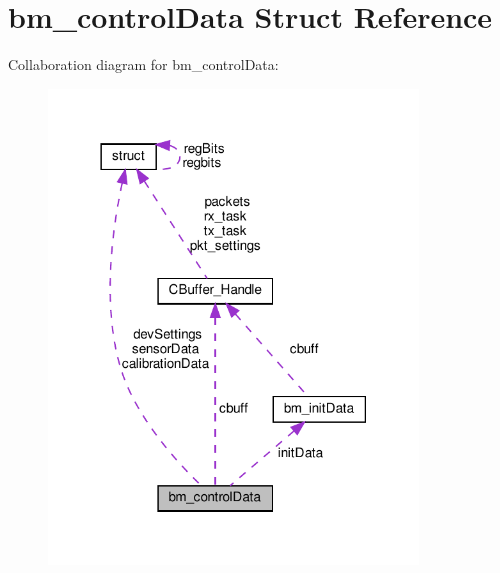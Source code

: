 \hypertarget{structbm__controlData}{}\section{bm\+\_\+control\+Data Struct Reference}
\label{structbm__controlData}


Collaboration diagram for bm\+\_\+control\+Data\+:\nopagebreak
\begin{figure}[H]
\begin{center}
\leavevmode
\includegraphics[width=278pt]{structbm__controlData__coll__graph}
\end{center}
\end{figure}
